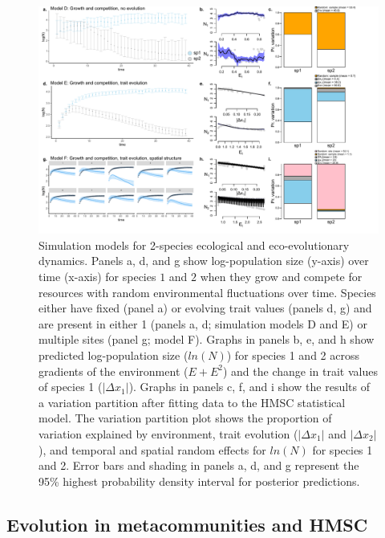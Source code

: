 \documentclass[
]{article}
\begin{document}
\begin{figure}

{\centering \includegraphics[width=1.1\linewidth]{../output/fig1_mod} 

}

\caption{Simulation models for 2-species ecological and eco-evolutionary dynamics. Panels a, d, and g show log-population size (y-axis) over time (x-axis) for species $1$ and $2$ when they grow and compete for resources with random environmental fluctuations over time. Species either have fixed (panel a) or evolving trait values (panels d, g) and are present in either 1 (panels a, d; simulation models D and E) or multiple sites (panel g; model F). Graphs in panels b, e, and h show predicted log-population size ($ln(N)$) for species 1 and 2 across gradients of the environment ($E + E^2$) and the change in trait values of species 1 ($|\Delta x_1|$). Graphs in panels c, f, and i show the results of a variation partition after fitting data to the HMSC statistical model. The variation partition plot shows the proportion of variation explained by environment, trait evolution ($|\Delta x_1|$ and $|\Delta x_2|$), and temporal and spatial random effects for $ln(N)$ for species 1 and 2. Error bars and shading in panels a, d, and g represent the 95\% highest probability density interval for posterior predictions.}\label{fig:fig1}
\end{figure}

\hypertarget{evolution-in-metacommunities-and-hmsc-1}{%
\subsection{Evolution in metacommunities and HMSC}\label{evolution-in-metacommunities-and-hmsc-1}}
\end{document}
